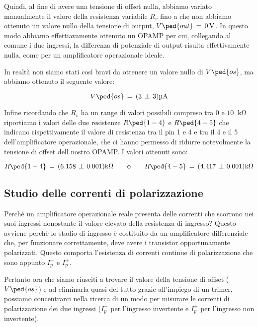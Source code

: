 Quindi, al fine di avere una tensione di offset nulla, abbiamo variato manualmente il valore della resistenza variabile $R_v$ fino a che non abbiamo ottenuto un valore nullo della tensione di output, $V\ped{out}\,=\,\SI{0}{\volt}$.
In questo modo abbiamo effettiavamente ottenuto un OPAMP per cui, collegando al comune i due ingressi, la differenza di potenziale di output risulta effettivamente nulla, come per un amplificatore operazionale ideale.

In realtà non siamo stati così bravi da ottenere un valore nullo di $V\ped{os}$, ma abbiamo ottenuto il seguente valore:

\begin{equation}
	V\ped{os}\,=\,(3\,\pm\,3)\SI{}{\micro\ampere}
\end{equation}

Infine ricordando che $R_v$ ha un range di valori possibili compreso tra $0$ e $10$ $\SI{}{\kilo\ohm}$ riportiamo i valori delle due resistenze $R\ped{1-4}$ e $R\ped{4-5}$ che indicano rispettivamente il valore di resistenza tra il pin 1 e 4  e tra il 4 e il 5 dell'amplificatore operazionale, che ci hanno permesso di ridurre notevolmente la tensione di offset dell nostro OPAMP. I valori ottenuti sono:

\begin{equation}
	R\ped{1-4}\,=\,(6.158\,\pm\,0.001)\SI{}{\kilo\ohm} \qquad \textbf{e} \qquad R\ped{4-5}\,=\,(4.417\,\pm\,0.001)\SI{}{\kilo\ohm}
\end{equation}

\subsection*{Studio delle correnti di polarizzazione}

Perchè un amplificatore operazionale reale presenta delle correnti che scorrono nei suoi ingressi nonostante il valore elevato della resistenza di ingresso? Questo avviene perchè lo stadio di ingresso è costituito da un amplificatore differenziale che, per funzionare correttamente, deve avere i transistor opportunamente polarizzati. Questo comporta l'esistenza di correnti continue di polarizzazione che sono appunto $I_{p}^-$ e $I_{p}^+$.

Pertanto ora che siamo riusciti a trovare il valore della tensione di offset ($V\ped{os}$) e ad eliminarla quasi del tutto grazie all'impiego di un trimer, possiamo concentrarci nella ricerca di un modo per misurare le correnti di polarizzazione dei due ingressi ($I_{p}^-$ per l'ingresso invertente e $I_{p}^+$ per l'ingresso non invertente).

